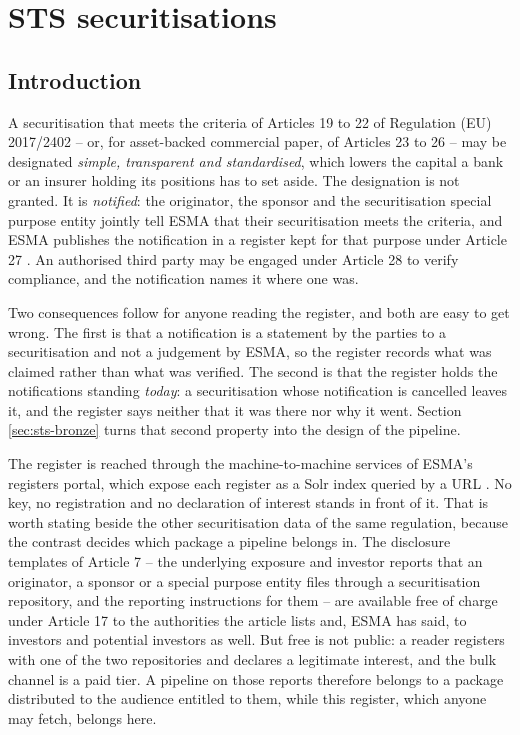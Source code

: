 \chapter{STS securitisations}\label{ch:sts}

\section{Introduction}

A securitisation that meets the criteria of Articles 19 to 22 of Regulation (EU) 2017/2402 -- or, for asset-backed commercial paper, of Articles 23 to 26 -- may be designated \emph{simple, transparent and standardised}, which lowers the capital a bank or an insurer holding its positions has to set aside. The designation is not granted. It is \emph{notified}: the originator, the sponsor and the securitisation special purpose entity jointly tell ESMA that their securitisation meets the criteria, and ESMA publishes the notification in a register kept for that purpose under Article 27 \parencite{EU.2017}. An authorised third party may be engaged under Article 28 to verify compliance, and the notification names it where one was.

Two consequences follow for anyone reading the register, and both are easy to get wrong. The first is that a notification is a statement by the parties to a securitisation and not a judgement by ESMA, so the register records what was claimed rather than what was verified. The second is that the register holds the notifications standing \emph{today}: a securitisation whose notification is cancelled leaves it, and the register says neither that it was there nor why it went. Section \ref{sec:sts-bronze} turns that second property into the design of the pipeline.

The register is reached through the machine-to-machine services of ESMA's registers portal, which expose each register as a Solr index queried by a URL \parencite{ESMA.2026b, ESMA.2026c}. No key, no registration and no declaration of interest stands in front of it. That is worth stating beside the other securitisation data of the same regulation, because the contrast decides which package a pipeline belongs in. The disclosure templates of Article 7 -- the underlying exposure and investor reports that an originator, a sponsor or a special purpose entity files through a securitisation repository, and the reporting instructions for them \parencite{ESMA.2021a} -- are available free of charge under Article 17 to the authorities the article lists and, ESMA has said, to investors and potential investors as well. But free is not public: a reader registers with one of the two repositories and declares a legitimate interest, and the bulk channel is a paid tier. A pipeline on those reports therefore belongs to a package distributed to the audience entitled to them, while this register, which anyone may fetch, belongs here.

